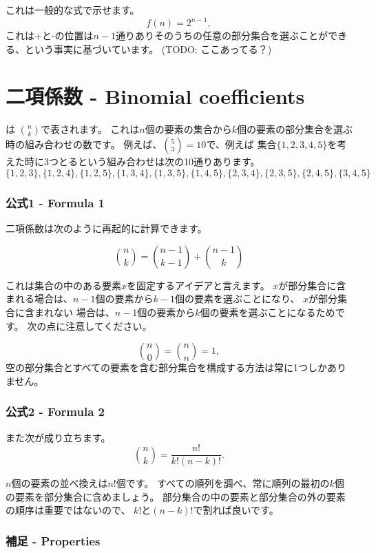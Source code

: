 これは一般的な式で示せます。
\[
f(n)=2^{n-1},
\]
これは+と-の位置は$n-1$通りありそのうちの任意の部分集合を選ぶことができる、という事実に基づいています。
(TODO: ここあってる？)

\section{二項係数 - Binomial coefficients}


 は
${n \choose k}$で表されます。
これは$n$個の要素の集合から$k$個の要素の部分集合を選ぶ時の組み合わせの数です。
例えば、${5 \choose 3}=10$で、例えば
集合$\{1,2,3,4,5\}$を考えた時に3つとるという組み合わせは次の10通りあります。
\[ \{1,2,3\}, \{1,2,4\}, \{1,2,5\}, \{1,3,4\}, \{1,3,5\},
\{1,4,5\}, \{2,3,4\}, \{2,3,5\}, \{2,4,5\}, \{3,4,5\} \]

\subsubsection{公式1 - Formula 1}

二項係数は次のように再起的に計算できます。

\[
{n \choose k}  =  {n-1 \choose k-1} + {n-1 \choose k}
\]

これは集合の中のある要素$x$を固定するアイデアと言えます。
$x$が部分集合に含まれる場合は、$n - 1$個の要素から$k - 1$個の要素を選ぶことになり、
$x$が部分集合に含まれない 場合は、$n - 1$個の要素から$k$個の要素を選ぶことになるためです。
次の点に注意してください。

\[
{n \choose 0}  =  {n \choose n} = 1,
\]
空の部分集合とすべての要素を含む部分集合を構成する方法は常に1つしかありません。

\subsubsection{公式2 - Formula 2}

また次が成り立ちます。
\[
{n \choose k}  =  \frac{n!}{k!(n-k)!}.
\]


$n$個の要素の並べ換えは$n!$個です。
すべての順列を調べ、常に順列の最初の$k$個の要素を部分集合に含めましょう。
部分集合の中の要素と部分集合の外の要素の順序は重要ではないので、
$k!$と$(n - k)!$で割れば良いです。

\subsubsection{補足 - Properties}

